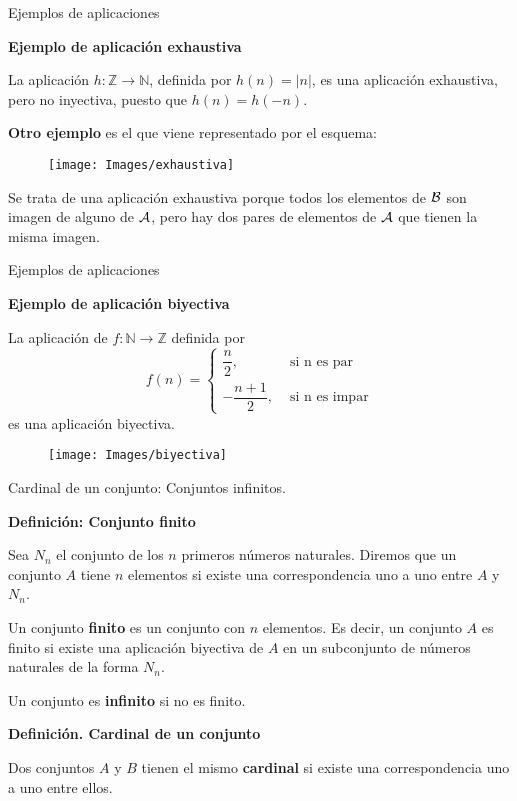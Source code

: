 \documentclass[
  ignorenonframetext,
]{beamer}
\begin{document}
\begin{frame}{Ejemplos de aplicaciones}
\protect\hypertarget{ejemplos-de-aplicaciones-1}{}

\textbf{Ejemplo de aplicación exhaustiva}

La aplicación \(h: \mathbb{Z} \rightarrow \mathbb{N}\), definida por
\(h(n)=|n|\), es una aplicación exhaustiva, pero no inyectiva, puesto
que \(h(n)=h(-n)\).

\textbf{Otro ejemplo} es el que viene representado por el esquema:

\begin{figure}
\texttt{[image: Images/exhaustiva]} \end{figure}

Se trata de una aplicación exhaustiva porque todos los elementos de
\(\cal{B}\) son imagen de alguno de \(\cal{A}\), pero hay dos pares de
elementos de \(\cal{A}\) que tienen la misma imagen.

\end{frame}

\begin{frame}{Ejemplos de aplicaciones}
\protect\hypertarget{ejemplos-de-aplicaciones-2}{}

\textbf{Ejemplo de aplicación biyectiva}

La aplicación de \(f: \mathbb{N} \rightarrow \mathbb{Z}\) definida por
\[
f(n) =
\begin{cases}
\dfrac{n}{2}, &  \text{ si n es par}\\
-\dfrac{n+1}{2},&  \text{ si n es impar}
\end{cases}
\] es una aplicación biyectiva.

\begin{figure}
\texttt{[image: Images/biyectiva]} \end{figure}

\end{frame}

\begin{frame}{Cardinal de un conjunto: Conjuntos infinitos.}
\protect\hypertarget{cardinal-de-un-conjunto-conjuntos-infinitos.-2}{}

\textbf{Definición: Conjunto finito}

Sea \(N_n\) el conjunto de los \(n\) primeros números naturales. Diremos
que un conjunto \(A\) tiene \(n\) elementos si existe una
correspondencia uno a uno entre \(A\) y \(N_n\).

Un conjunto \textbf{finito} es un conjunto con \(n\) elementos. Es
decir, un conjunto \(A\) es finito si existe una aplicación biyectiva de
\(A\) en un subconjunto de números naturales de la forma \(N_n\).

Un conjunto es \textbf{infinito} si no es finito.

\textbf{Definición. Cardinal de un conjunto}

Dos conjuntos \(A\) y \(B\) tienen el mismo \textbf{cardinal} si existe
una correspondencia uno a uno entre ellos.

\end{frame}
\end{document}
